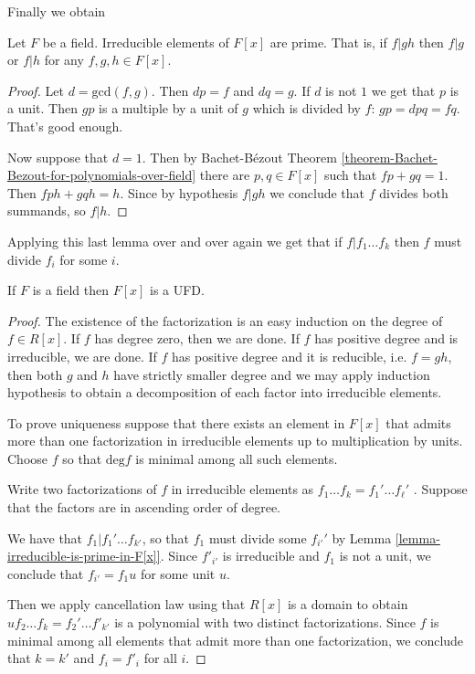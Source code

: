 Finally we obtain

\begin{lemma}
\label{lemma-irreducible-is-prime-in-F[x]}
Let $F$ be a field. Irreducible elements of $F[x]$ are prime. That is, if $f|gh$
then $f|g$ or $f|h$ for any $f,g,h \in F[x]$.
\end{lemma}

\begin{proof}
Let $d=\text{gcd}(f,g)$. Then $dp=f$ and $dq=g$. If $d$ is not $1$ 
we get that $p$ is a unit. Then $gp$ is a multiple by a unit of $g$ which is
divided by $f$: $gp=dpq=fq$. That's good enough.

Now suppose that $d=1$. Then by Bachet-Bézout Theorem
\ref{theorem-Bachet-Bezout-for-polynomials-over-field} 
there are $p,q \in F[x]$ such that $fp+gq=1$. Then $fph+gqh=h$. Since by
hypothesis $f|gh$ we conclude that $f$ divides both summands, so $f|h$.
\end{proof}

Applying this last lemma over and over again we get that if $f|f_1\ldots f_k$
then $f$ must divide $f_i$ for some $i$.

\begin{lemma}
\label{lemma-polynomials-over-fields-are-UFD}
If $F$ is a field then $F[x]$ is a UFD.
\end{lemma}

\begin{proof}
The existence of the factorization is an easy induction on the degree of $f\in
R[x]$. If $f$ has degree zero, then we are done. If $f$ has positive degree and
is irreducible, we are done. If $f$ has positive degree and it is reducible,
i.e. $f=gh$, then both $g$ and $h$ have strictly smaller degree and we may apply
induction hypothesis to obtain a decomposition of each factor into irreducible
elements.

To prove uniqueness suppose that there exists an element in $F[x]$ that admits
more than one factorization in irreducible elements 
up to multiplication by units. Choose $f$ so that
$\text{deg}f$ is minimal among all such elements.

Write two factorizations of $f$ in irreducible elements as 
$f_1\ldots f_k=f_1'\ldots f_\ell'$ . Suppose that the factors are in
ascending order of degree.

We have that $f_1|f_1'\ldots f_{k'}$, so
that $f_1$ must divide some $f_{i'}'$ 
by Lemma \ref{lemma-irreducible-is-prime-in-F[x]}. 
Since $f'_{i'}$ is irreducible and $f_1$ is
not a unit, we conclude that $f_{i'}=f_1 u$ for some unit $u$.

Then we apply cancellation law using that $R[x]$ is a domain
to obtain $uf_2\ldots f_k=f_2'\ldots f'_{k'}$ is a
polynomial with two distinct factorizations.
Since $f$ is minimal among all
elements that admit more than one factorization, we conclude that $k=k'$ and
$f_i=f'_i$ for all $i$.
\end{proof}

